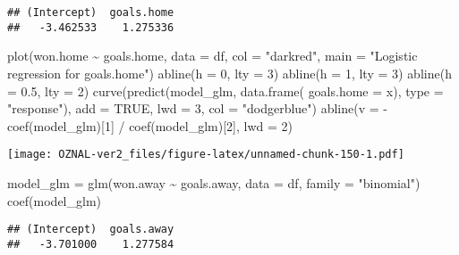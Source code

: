 \documentclass[
]{article}
\newenvironment{Shaded}{\begin{snugshade}}{\end{snugshade}}
\newcommand{\AttributeTok}[1]{\textcolor[rgb]{0.77,0.63,0.00}{#1}}
\newcommand{\ConstantTok}[1]{\textcolor[rgb]{0.00,0.00,0.00}{#1}}
\newcommand{\DecValTok}[1]{\textcolor[rgb]{0.00,0.00,0.81}{#1}}
\newcommand{\FloatTok}[1]{\textcolor[rgb]{0.00,0.00,0.81}{#1}}
\newcommand{\FunctionTok}[1]{\textcolor[rgb]{0.00,0.00,0.00}{#1}}
\newcommand{\NormalTok}[1]{#1}
\newcommand{\OtherTok}[1]{\textcolor[rgb]{0.56,0.35,0.01}{#1}}
\newcommand{\SpecialCharTok}[1]{\textcolor[rgb]{0.00,0.00,0.00}{#1}}
\newcommand{\StringTok}[1]{\textcolor[rgb]{0.31,0.60,0.02}{#1}}
\begin{document}
\begin{verbatim}
## (Intercept)  goals.home 
##   -3.462533    1.275336
\end{verbatim}

\begin{Shaded}
\begin{Highlighting}[]
\FunctionTok{plot}\NormalTok{(won.home }\SpecialCharTok{\textasciitilde{}}\NormalTok{ goals.home, }\AttributeTok{data =}\NormalTok{ df, }
     \AttributeTok{col =} \StringTok{"darkred"}\NormalTok{,}
     \AttributeTok{main =} \StringTok{"Logistic regression for goals.home"}\NormalTok{)}
\FunctionTok{abline}\NormalTok{(}\AttributeTok{h =} \DecValTok{0}\NormalTok{, }\AttributeTok{lty =} \DecValTok{3}\NormalTok{)}
\FunctionTok{abline}\NormalTok{(}\AttributeTok{h =} \DecValTok{1}\NormalTok{, }\AttributeTok{lty =} \DecValTok{3}\NormalTok{)}
\FunctionTok{abline}\NormalTok{(}\AttributeTok{h =} \FloatTok{0.5}\NormalTok{, }\AttributeTok{lty =} \DecValTok{2}\NormalTok{)}
\FunctionTok{curve}\NormalTok{(}\FunctionTok{predict}\NormalTok{(model\_glm, }\FunctionTok{data.frame}\NormalTok{( }\AttributeTok{goals.home =}\NormalTok{ x), }\AttributeTok{type =} \StringTok{"response"}\NormalTok{), }\AttributeTok{add =} \ConstantTok{TRUE}\NormalTok{, }\AttributeTok{lwd =} \DecValTok{3}\NormalTok{, }\AttributeTok{col =} \StringTok{"dodgerblue"}\NormalTok{)}
\FunctionTok{abline}\NormalTok{(}\AttributeTok{v =} \SpecialCharTok{{-}}\FunctionTok{coef}\NormalTok{(model\_glm)[}\DecValTok{1}\NormalTok{] }\SpecialCharTok{/} \FunctionTok{coef}\NormalTok{(model\_glm)[}\DecValTok{2}\NormalTok{], }\AttributeTok{lwd =} \DecValTok{2}\NormalTok{)}
\end{Highlighting}
\end{Shaded}

\texttt{[image: OZNAL-ver2\_files/figure-latex/unnamed-chunk-150-1.pdf]}

\begin{Shaded}
\begin{Highlighting}[]
\NormalTok{model\_glm }\OtherTok{=} \FunctionTok{glm}\NormalTok{(won.away }\SpecialCharTok{\textasciitilde{}}\NormalTok{ goals.away, }\AttributeTok{data =}\NormalTok{ df, }\AttributeTok{family =} \StringTok{"binomial"}\NormalTok{)}
\FunctionTok{coef}\NormalTok{(model\_glm)}
\end{Highlighting}
\end{Shaded}

\begin{verbatim}
## (Intercept)  goals.away 
##   -3.701000    1.277584
\end{verbatim}
\end{document}
